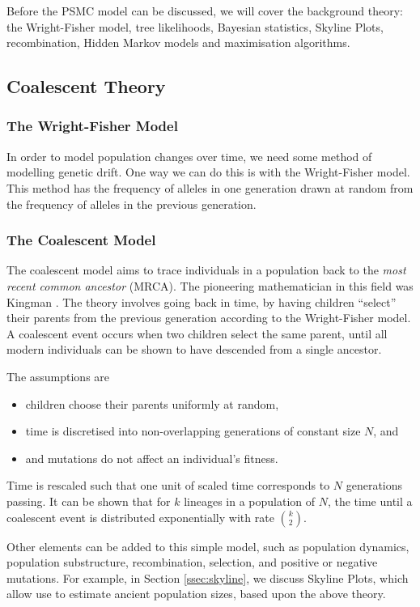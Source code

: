 \documentclass[12pt]{article}
\begin{document}
Before the PSMC model can be discussed, we will cover the background theory: the Wright-Fisher model, tree likelihoods, Bayesian statistics, Skyline Plots, recombination, Hidden Markov models and maximisation algorithms.

\subsection{Coalescent Theory}\label{ssec:CoalTh}
\subsubsection{The Wright-Fisher Model}\label{sssec:WFMo}
In order to model population changes over time, we need some method of modelling genetic drift. One way we can do this is with the Wright-Fisher model. This method has the frequency of alleles in one generation drawn at random from the frequency of alleles in the previous generation.

\subsubsection{The Coalescent Model}\label{sssec:CoalMo}
The coalescent model aims to trace individuals in a population back to the \emph{most recent common ancestor} (MRCA). The pioneering mathematician in this field was Kingman \cite{kingman1982genealogy}. The theory involves going back in time, by having children ``select'' their parents from the previous generation according to the Wright-Fisher model. A coalescent event occurs when two children select the same parent, until all modern individuals can be shown to have descended from a single ancestor.

The assumptions are
\begin{itemize}
\item children choose their parents uniformly at random,
\item time is discretised into non-overlapping generations of constant size $N$, and
  \item and mutations do not affect an individual's fitness.
\end{itemize}
Time is rescaled such that one unit of scaled time corresponds to $N$ generations passing. It can be shown that for $k$ lineages in a population of $N$, the time until a coalescent event is distributed exponentially with rate ${k\choose 2}$.

Other elements can be added to this simple model, such as population dynamics, population substructure, recombination, selection, and positive or negative mutations. For example, in Section \ref{ssec:skyline}, we discuss Skyline Plots, which allow use to estimate ancient population sizes, based upon the above theory.
\end{document}
